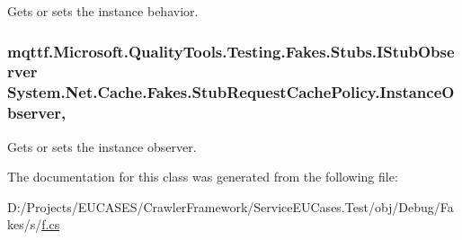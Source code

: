 Gets or sets the instance behavior.

\hypertarget{class_system_1_1_net_1_1_cache_1_1_fakes_1_1_stub_request_cache_policy_a3b325ea2deae2a7ae28b27f943ae6864}{
\subsubsection[{Instance\-Observer}]{\setlength{\rightskip}{0pt plus 5cm}mqttf.\-Microsoft.\-Quality\-Tools.\-Testing.\-Fakes.\-Stubs.\-I\-Stub\-Observer System.\-Net.\-Cache.\-Fakes.\-Stub\-Request\-Cache\-Policy.\-Instance\-Observer\hspace{0.3cm}{\ttfamily [get]}, {\ttfamily [set]}}}\label{class_system_1_1_net_1_1_cache_1_1_fakes_1_1_stub_request_cache_policy_a3b325ea2deae2a7ae28b27f943ae6864}


Gets or sets the instance observer.



The documentation for this class was generated from the following file\-:\begin{DoxyCompactItemize}
\item 
D\-:/\-Projects/\-E\-U\-C\-A\-S\-E\-S/\-Crawler\-Framework/\-Service\-E\-U\-Cases.\-Test/obj/\-Debug/\-Fakes/s/\hyperlink{s_2f_8cs}{f.\-cs}\end{DoxyCompactItemize}
